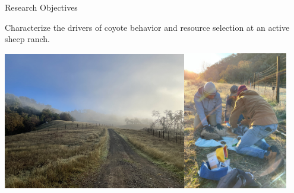 \documentclass[
  ignorenonframetext,
]{beamer}
\begin{document}
\begin{frame}{Research Objectives}
\protect\hypertarget{research-objectives}{}

Characterize the drivers of coyote behavior and resource selection at an
active sheep ranch.

\includegraphics[width=0.6\textwidth,height=\textheight]{images/hopland.png}\includegraphics[width=0.34\textwidth,height=\textheight]{images/capture.png}

\end{frame}
\end{document}
